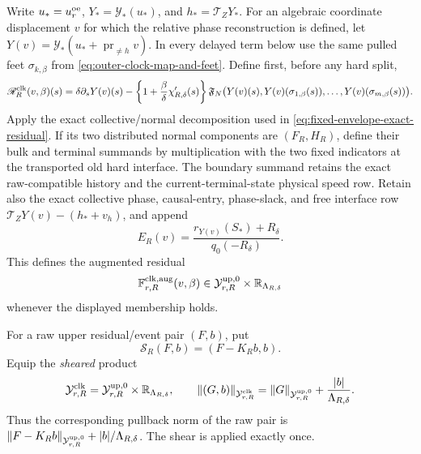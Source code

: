 Write \(u_*=u_r^{\rm oe}\), \(Y_*=\mathcal Y_*(u_*)\), and
\(h_*=\mathcal T_ZY_*\).  For an algebraic coordinate displacement \(v\)
for which the relative phase reconstruction is defined, let
\(Y(v)=\mathcal Y_*(u_*+\operatorname{pr}_{\ne h}v)\).  In every delayed term below use the same
pulled feet \(\sigma_{k,\beta}\) from
\cref{eq:outer-clock-map-and-feet}.  Define first, before any hard split,
\begin{equation}
 \mathscr R_R^{\rm clk}(v,\beta)(s)
 =\delta\partial_sY(v)(s)
 -\left\{1+\frac{\beta}{\delta}\chi_{R,\delta}'(s)\right\}
 \mathfrak F_N\bigl(Y(v)(s),Y(v)(\sigma_{1,\beta}(s)),\ldots,
                         Y(v)(\sigma_{m,\beta}(s))\bigr).
                                                        \label{eq:outer-clock-unsplit-row}
\end{equation}
Apply the exact collective/normal decomposition used in
\cref{eq:fixed-envelope-exact-residual}.  If its two distributed normal
components are \((F_R,H_R)\), define their bulk and terminal summands by
multiplication with the two fixed indicators at the transported old hard
interface.  The boundary summand retains the exact raw-compatible history
and the current-terminal-state physical speed row.  Retain also the exact
collective phase, causal-entry, phase-slack, and free interface row
\(\mathcal T_ZY(v)-(h_*+v_h)\), and append
\[
 E_R(v)=\frac{r_{Y(v)}(S_*)+R_\delta}{q_0(-R_\delta)}.
\]
This defines the augmented residual
\begin{equation}
 \mathbb F_{r,R}^{\rm clk,aug}(v,\beta)
 \in\mathcal Y_{r,R}^{\rm up,0}
       \times\mathbb R_{\Lambda_{R,\delta}}
                                                        \label{eq:outer-clock-raw-augmented-residual}
\end{equation}
whenever the displayed membership holds.

For a raw upper residual/event pair \((F,b)\), put
\begin{equation}
 \mathscr S_R(F,b)=(F-K_Rb,b).                  \label{eq:outer-clock-range-shear}
\end{equation}
Equip the \emph{sheared} product
\begin{equation}
 \mathcal Y_{r,R}^{\rm clk}
 =\mathcal Y_{r,R}^{\rm up,0}
       \times\mathbb R_{\Lambda_{R,\delta}},
 \qquad
 \|(G,b)\|_{\mathcal Y_{r,R}^{\rm clk}}
 =\|G\|_{\mathcal Y_{r,R}^{\rm up,0}}
       +\frac{|b|}{\Lambda_{R,\delta}}.         \label{eq:outer-clock-sheared-range-norm}
\end{equation}
Thus the corresponding pullback norm of the raw pair is
\(\|F-K_Rb\|_{\mathcal Y_{r,R}^{\rm up,0}}
+|b|/\Lambda_{R,\delta}\).
The shear is applied exactly once.

